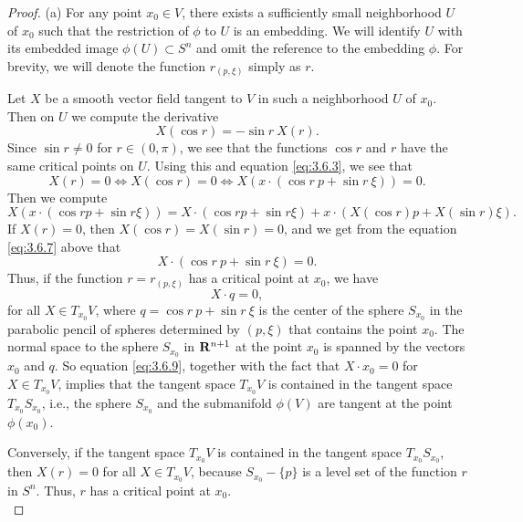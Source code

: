 \documentclass[10pt,a4paper]{amsart}
\begin{document}
\begin{proof}
(a) For any point $x_0 \in V$, there exists a sufficiently small neighborhood $U$ of $x_0$ such that the
restriction of $\phi$ to $U$ is an embedding. We will identify $U$ with its embedded image
$\phi (U) \subset S^n$ and omit the reference to the embedding $\phi$. For brevity, we will denote the
function $r_{(p,\xi)}$ simply as $r$.

Let $X$ be a
smooth vector field tangent to $V$ in such a neighborhood $U$ of $x_0$.  Then on $U$ we compute the derivative
\begin{equation}
\label{eq:3.6.5}
X(\cos r) = - \sin r \ X(r).
\end{equation}
Since $\sin r \neq 0$ for $r \in (0, \pi)$, we see that the functions $\cos r$ and $r$ have the same critical
points on $U$.  Using this and equation \eqref{eq:3.6.3}, we see that
\begin{equation}
\label{eq:3.6.6}
X(r) = 0 \Leftrightarrow X(\cos r) = 0 \Leftrightarrow X(x \cdot (\cos r\  p + \sin r\  \xi)) = 0.
\end{equation}
Then we compute
\begin{equation}
\label{eq:3.6.7}
X(x \cdot (\cos r p + \sin r \xi)) = X \cdot (\cos r p + \sin r \xi) + x \cdot (X(\cos r) p + X(\sin r) \xi).
\end{equation}
If $X(r) = 0$, then $X(\cos r) = X(\sin r) = 0$, and we get from the equation \eqref{eq:3.6.7} above that
\begin{equation}
\label{eq:3.6.8}
X \cdot (\cos r\  p + \sin r\  \xi) = 0.
\end{equation}
Thus, if the function $r = r_{(p,\xi)}$ has a critical point at $x_0$, we have
\begin{equation}
\label{eq:3.6.9}
X \cdot q = 0,
\end{equation}
for all $X \in T_{x_0}V$, where $ q = \cos r\  p + \sin r\  \xi$ is the center of the sphere $S_{x_0}$ in the parabolic
pencil of spheres determined by $(p, \xi)$ that contains the point $x_0$.  The normal space 
to the sphere $S_{x_0}$ in
${\bf R}^{n+1}$ at the point $x_0$
is spanned by the vectors $x_0$ and $q$.  So equation \eqref{eq:3.6.9}, together with the fact that
$X \cdot x_0 = 0$ for $X \in T_{x_0}V$, implies that the tangent space $T_{x_0}V$ is contained in the tangent
space $T_{x_0}S_{x_0}$, i.e., the sphere $S_{x_0}$ and the submanifold $\phi (V)$ are tangent at the point $\phi (x_0)$.

Conversely, if the tangent space $T_{x_0}V$ is contained in the tangent
space $T_{x_0}S_{x_0}$, then $X(r) = 0$ for all $X \in T_{x_0}V$, because $S_{x_0} - \{p\}$ is a level set of the function
$r$ in $S^n$. Thus, $r$ has a critical point at $x_0$.\\


\end{proof}
\end{document}
